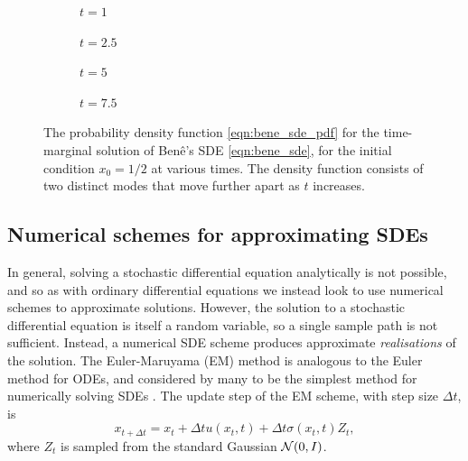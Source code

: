 \begin{figure}
	\begin{center}
		\begin{subfigure}{0.49\textwidth}
			\caption{\(t = 1\)}
			\label{fig:bene_1}
		\end{subfigure}
		\begin{subfigure}{0.49\textwidth}
			\caption{\(t = 2.5\)}
			\label{fig:bene_2.5}
		\end{subfigure}
		\begin{subfigure}{0.49\textwidth}
			\caption{\(t = 5\)}
			\label{fig:bene_5}
		\end{subfigure}
		\begin{subfigure}{0.49\textwidth}
			\caption{\(t = 7.5\)}
			\label{fig:bene_7.5}
		\end{subfigure}
	\end{center}
	\caption{The probability density function \eqref{eqn:bene_sde_pdf} for the time-marginal solution of Ben\^e's SDE \eqref{eqn:bene_sde}, for the initial condition \(x_0 = 1/2\) at various times.
		The density function consists of two distinct modes that move further apart as \(t\) increases.}
	\label{fig:bene_pdf}
\end{figure}



\begin{example}

\end{example}


\subsection{Numerical schemes for approximating SDEs}
In general, solving a stochastic differential equation analytically is not possible, and so as with ordinary differential equations we instead look to use numerical schemes to approximate solutions.
However, the solution to a stochastic differential equation is itself a random variable, so a single sample path is not sufficient.
Instead, a numerical SDE scheme produces approximate \emph{realisations} of the solution.
The Euler-Maruyama (EM) method is analogous to the Euler method for ODEs, and considered by many to be the simplest method for numerically solving SDEs \citep{KloedenPlaten_1992_NumericalSolutionStochastic}.
The update step of the EM scheme, with step size \(\Delta t\), is
\begin{equation}
	x_{t + \Delta t} = x_{t} + \Delta t u\left(x_t, t\right) + \Delta t \sigma\left(x_t, t\right) Z_t,
	\label{eqn:em_step}
\end{equation}
where \(Z_t\) is sampled from the standard Gaussian \(\mathcal{N}\!\left(0,I\right)\).


